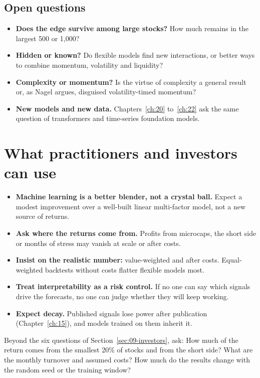 \subsection{Open questions}
\label{sec:20-open}

\begin{itemize}
  \item \textbf{Does the edge survive among large stocks?} How much remains in the largest 500 or 1,000?
  \item \textbf{Hidden or known?} Do flexible models find new interactions, or better ways to combine momentum, volatility and liquidity?
  \item \textbf{Complexity or momentum?} Is the virtue of complexity a general result or, as Nagel argues, disguised volatility-timed momentum?
  \item \textbf{New models and new data.} Chapters~\ref{ch:20} to~\ref{ch:22} ask the same question of transformers and time-series foundation models.
\end{itemize}

\section{What practitioners and investors can use}
\label{sec:20-investors}

\begin{itemize}
  \item \textbf{Machine learning is a better blender, not a crystal ball.} Expect a modest improvement over a well-built linear multi-factor model, not a new source of returns.
  \item \textbf{Ask where the returns come from.} Profits from microcaps, the short side or months of stress may vanish at scale or after costs.
  \item \textbf{Insist on the realistic number:} value-weighted and after costs. Equal-weighted backtests without costs flatter flexible models most.
  \item \textbf{Treat interpretability as a risk control.} If no one can say which signals drive the forecasts, no one can judge whether they will keep working.
  \item \textbf{Expect decay.} Published signals lose power after publication (Chapter~\ref{ch:15}), and models trained on them inherit it.
\end{itemize}

Beyond the six questions of Section~\ref{sec:09-investors}, ask: How much of the return comes from the smallest 20\% of stocks and from the short side? What are the monthly turnover and assumed costs? How much do the results change with the random seed or the training window?

